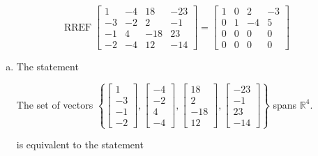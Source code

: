\begin{exerciseAnswer} 


\[\operatorname{RREF} \left[\begin{array}{cccc}
1 & -4 & 18 & -23 \\
-3 & -2 & 2 & -1 \\
-1 & 4 & -18 & 23 \\
-2 & -4 & 12 & -14
\end{array}\right] = \left[\begin{array}{cccc}
1 & 0 & 2 & -3 \\
0 & 1 & -4 & 5 \\
0 & 0 & 0 & 0 \\
0 & 0 & 0 & 0
\end{array}\right] \]


\begin{enumerate}[(a)]
\item The statement 
\begin{center}\begin{minipage}{0.8\textwidth}
 The set of vectors \( \left\{ \left[\begin{array}{c}
1 \\
-3 \\
-1 \\
-2
\end{array}\right] , \left[\begin{array}{c}
-4 \\
-2 \\
4 \\
-4
\end{array}\right] , \left[\begin{array}{c}
18 \\
2 \\
-18 \\
12
\end{array}\right] , \left[\begin{array}{c}
-23 \\
-1 \\
23 \\
-14
\end{array}\right] \right\} \) spans \(\mathbb{R}^4\). 
\end{minipage}\end{center}
     is equivalent to the statement 
\begin{center}\begin{minipage}{0.8\textwidth}
 The vector equation \( x_{1} \left[\begin{array}{c}
1 \\
-3 \\

\end{array}
\end{minipage}
\end{center}
\end{enumerate}
\end{exerciseAnswer}
